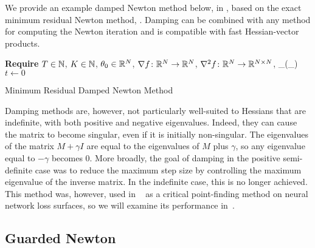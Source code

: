 \documentclass[../../thesis.tex]{subfiles}
\begin{document}
We provide an example damped Newton method below,
in ,
based on the exact minimum residual Newton method,
.
Damping can be combined with any method for computing
the Newton iteration and is compatible
with fast Hessian-vector products.
\\
\begin{algorithm}[h]
    \SetAlgoLined{}
    \textbf{Require}
    $T\in \mathbb{N}$, $K \in \mathbb{N}$, $\theta_0 \in \mathbb{R}^N$,
    $\nabla{f}\colon\mathbb{R}^N\to\mathbb{R}^N$,
    $\nabla^2{f}\colon\mathbb{R}^N\to\mathbb{R}^{N\times N}$,
    \Gamma \in \cP_\omega(\R_{})\\
    $t \leftarrow 0$\\
    \caption{Minimum Residual Damped Newton Method}
\end{algorithm}

Damping methods are, however,
not particularly well-suited to Hessians that are indefinite,
with both positive and negative eigenvalues.
Indeed, they can cause the matrix to become singular,
even if it is initially non-singular.
The eigenvalues of the matrix $M + \gamma I$
are equal to the eigenvalues of $M$ plus $\gamma$,
so any eigenvalue equal to $-\gamma$ becomes $0$.
More broadly,
the goal of damping in the positive semi-definite case
was to reduce the maximum step size by controlling
the maximum eigenvalue of the inverse matrix.
In the indefinite case, this is no longer achieved.
This method was, however, used in%
~\cite{dauphin2014}
as a critical point-finding method
on neural network loss surfaces,
so we will examine its performance in~.

\subsection{Guarded Newton}
\end{document}
